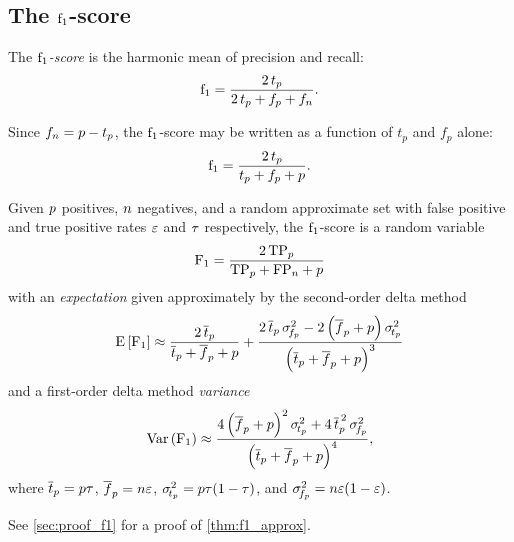 \subsection{The \texorpdfstring{$\mathrm{f}_1$}{F1}-score}
\label{sec:f1}
\begin{definition}
	The \emph{$\mathrm{f}_1$-score} is the harmonic mean of precision and recall:
	\begin{equation}
	\mathrm{f}_1 = \frac{2\,t_p}{2\,t_p + f_p + f_n}.
	\end{equation}
\end{definition}
Since $f_n = p - t_p$, the $\mathrm{f}_1$-score may be written as a function of $t_p$ and $f_p$ alone:
\begin{equation}
\label{eq:f1_reduced}
\mathrm{f}_1 = \frac{2\,t_p}{t_p + f_p + p}.
\end{equation}
\begin{theorem}
	\label{thm:f1_approx}
	Given $p$ positives, $n$ negatives, and a random approximate set with false positive and true positive rates $\varepsilon$ and $\tau$ respectively, the $\mathrm{f}_1$-score is a random variable
	\begin{equation}
	\mathrm{F_1} = \frac{2\,\mathrm{TP}_{p}}{\mathrm{TP}_{p} + \mathrm{FP}_{n} + p}
	\end{equation}
	with an \emph{expectation} given approximately by the second-order delta method
	\begin{equation}
	\label{eq:f1_approx}
	\Expect{\Fone} \approx
	\frac{2\,\overline{t}_\p}{\overline{t}_\p + \overline{f}_\p + \p}
	+ \frac{2\,\overline{t}_\p\,\sigma_{\!f_\p}^2 -
		2\left(\overline{f}_\p + \p\right)\sigma_{\!t_\p}^2}
	{\left(\overline{t}_\p + \overline{f}_\p + \p\right)^3}
	\end{equation}
	and a first-order delta method \emph{variance}
	\begin{equation}
	\label{eq:var_f1}
	\Var{\Fone} \approx
	\frac{4\left(\overline{f}_\p + \p\right)^2 \sigma_{\!t_\p}^2 +
		4\,\overline{t}_\p^{\,2}\,\sigma_{\!f_\p}^2}
	{\left(\overline{t}_\p + \overline{f}_\p + \p\right)^4},
	\end{equation}
	where $\overline{t}_p = p\tau$, $\overline{f}_p = n\varepsilon$,
	$\sigma_{\!t_p}^2 = p\tau(1-\tau)$, and
	$\sigma_{\!f_p}^2 = n\varepsilon(1-\varepsilon)$.
\end{theorem}
See \cref{sec:proof_f1} for a proof of \cref{thm:f1_approx}.

